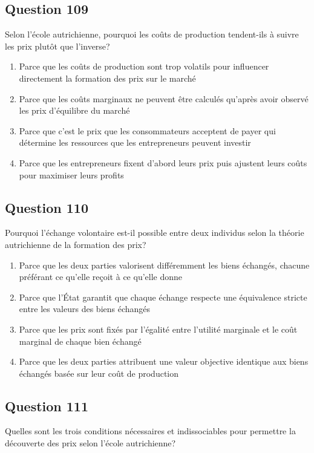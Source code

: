 \documentclass[12pt,a4paper]{article}
\begin{document}
\subsection*{Question 109}
Selon l'école autrichienne, pourquoi les coûts de production tendent-ils à suivre les prix plutôt que l'inverse?

\begin{enumerate}[label=\Alph*., leftmargin=*]
\item Parce que les coûts de production sont trop volatils pour influencer directement la formation des prix sur le marché
\item Parce que les coûts marginaux ne peuvent être calculés qu'après avoir observé les prix d'équilibre du marché
\item Parce que c'est le prix que les consommateurs acceptent de payer qui détermine les ressources que les entrepreneurs peuvent investir
\item Parce que les entrepreneurs fixent d'abord leurs prix puis ajustent leurs coûts pour maximiser leurs profits
\end{enumerate}

\bigskip


\subsection*{Question 110}
Pourquoi l'échange volontaire est-il possible entre deux individus selon la théorie autrichienne de la formation des prix?

\begin{enumerate}[label=\Alph*., leftmargin=*]
\item Parce que les deux parties valorisent différemment les biens échangés, chacune préférant ce qu'elle reçoit à ce qu'elle donne
\item Parce que l'État garantit que chaque échange respecte une équivalence stricte entre les valeurs des biens échangés
\item Parce que les prix sont fixés par l'égalité entre l'utilité marginale et le coût marginal de chaque bien échangé
\item Parce que les deux parties attribuent une valeur objective identique aux biens échangés basée sur leur coût de production
\end{enumerate}

\bigskip


\subsection*{Question 111}
Quelles sont les trois conditions nécessaires et indissociables pour permettre la découverte des prix selon l'école autrichienne?
\end{document}
